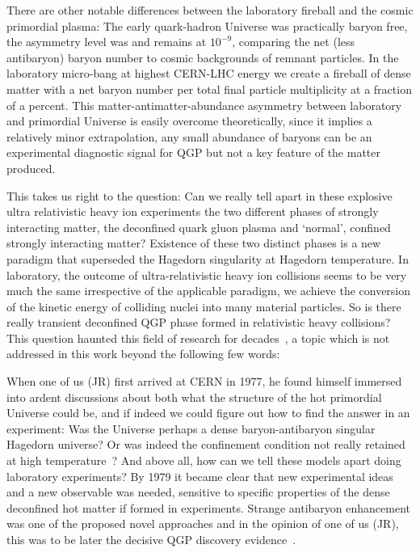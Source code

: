 There are other notable differences between the laboratory fireball and the cosmic primordial plasma: The early quark-hadron Universe was practically baryon free, the asymmetry level was and remains at $10^{-9}$, comparing the net (less antibaryon)  baryon number to cosmic backgrounds of remnant particles. In the laboratory micro-bang at highest CERN-LHC energy we create a fireball of dense matter with a net baryon number per total final particle multiplicity at a fraction of a percent. This matter-antimatter-abundance asymmetry between laboratory and primordial Universe is easily overcome theoretically, since it implies a relatively minor extrapolation, any small abundance of baryons can be an experimental diagnostic signal for QGP but not a key feature of the matter produced.

This takes us right to the question: Can we really tell apart in these explosive ultra relativistic heavy ion experiments the two different phases of strongly interacting matter, the deconfined quark gluon plasma and `normal', confined strongly interacting matter? Existence of these two distinct phases is a new paradigm that superseded the Hagedorn singularity at Hagedorn temperature. In laboratory, the outcome of ultra-relativistic heavy ion collisions seems to be very much the same irrespective of the applicable paradigm, we achieve the conversion of the kinetic energy of colliding nuclei into many material particles. So is there really transient deconfined QGP phase formed in relativistic heavy collisions? This question haunted this field of research for decades~\cite{Rafelski:2015cxa,Harris:2024aov}, a topic which is not addressed in this work beyond the following few words: 

When one of us (JR) first arrived at CERN in 1977, he found himself immersed into ardent discussions about both what the structure of the hot primordial Universe could be, and if indeed we could figure out how to find the answer in an experiment: Was the Universe perhaps a dense baryon-antibaryon singular Hagedorn universe? Or was indeed the confinement condition not really retained at high temperature~\cite{Weinberg:1974hy,Harrington:1974fc,Cabibbo:1975ig}? And above all, how can we tell these models apart doing laboratory experiments? By 1979 it became clear that new experimental ideas and a new observable was needed, sensitive to  specific properties of the dense deconfined hot matter if formed in experiments. Strange antibaryon enhancement was one of the proposed novel approaches and in the opinion of one of us (JR), this was to be later the decisive QGP discovery evidence~\cite{Rafelski:2019twp}.


